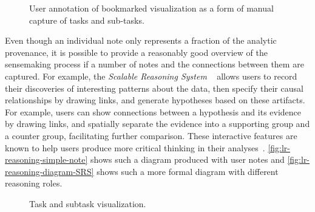 \begin{figure}
\centering
{}
\hspace{1cm}
\caption[User annotation of bookmarked visualization]{User annotation of bookmarked visualization as a form of manual capture of tasks and sub-tasks. }
\label{fig:lr-annotation}
\end{figure}

Even though an individual note only represents a fraction of the analytic provenance, it is possible to provide a reasonably good overview of the sensemaking process if a number of notes and the connections between them are captured. For example, the \emph{Scalable Reasoning System} ~\cite{Pike2009} allows users to record their discoveries of interesting patterns about the data, then specify their causal relationships by drawing links, and generate hypotheses based on these artifacts. For example, users can show connections between a hypothesis and its evidence by drawing links, and spatially separate the evidence into a supporting group and a counter group, facilitating further comparison. These interactive features are known to help users produce more critical thinking in their analyses~\cite{Sedig2013}.  \autoref{fig:lr-reasoning-simple-note} shows such a diagram produced with user notes and \autoref{fig:lr-reasoning-diagram-SRS} shows such a more formal diagram with different reasoning roles.

\begin{figure}
\centering
{}
\hfill
{}
\caption{Task and subtask visualization.}
\end{figure}

